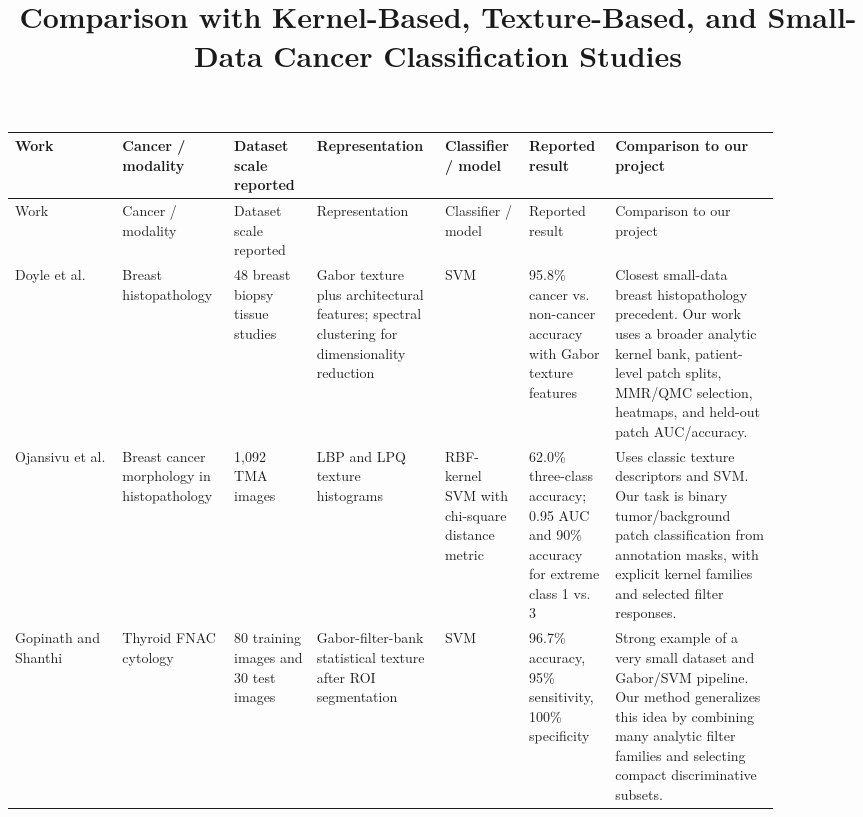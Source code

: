 \documentclass[9pt]{article}
\title{\textbf{Comparison with Kernel-Based, Texture-Based, and Small-Data Cancer Classification Studies}}
\author{}
\date{}
\begin{document}
\maketitle


\scriptsize
\begin{longtable}{p{0.13\linewidth}p{0.13\linewidth}p{0.10\linewidth}p{0.13\linewidth}p{0.10\linewidth}p{0.10\linewidth}p{0.20\linewidth}}
\toprule
Work & Cancer / modality & Dataset scale reported & Representation & Classifier / model & Reported result & Comparison to our project \\
\midrule
\endfirsthead
\toprule
Work & Cancer / modality & Dataset scale reported & Representation & Classifier / model & Reported result & Comparison to our project \\
\midrule
\endhead

Doyle et al. \cite{doyle2008} & Breast histopathology & 48 breast biopsy tissue studies & Gabor texture plus architectural features; spectral clustering for dimensionality reduction & SVM & 95.8\% cancer vs. non-cancer accuracy with Gabor texture features & Closest small-data breast histopathology precedent. Our work uses a broader analytic kernel bank, patient-level patch splits, MMR/QMC selection, heatmaps, and held-out patch AUC/accuracy. \\

Ojansivu et al. \cite{ojansivu2013} & Breast cancer morphology in histopathology & 1,092 TMA images & LBP and LPQ texture histograms & RBF-kernel SVM with chi-square distance metric & 62.0\% three-class accuracy; 0.95 AUC and 90\% accuracy for extreme class 1 vs. 3 & Uses classic texture descriptors and SVM. Our task is binary tumor/background patch classification from annotation masks, with explicit kernel families and selected filter responses. \\

Gopinath and Shanthi \cite{gopinath2013} & Thyroid FNAC cytology & 80 training images and 30 test images & Gabor-filter-bank statistical texture after ROI segmentation & SVM & 96.7\% accuracy, 95\% sensitivity, 100\% specificity & Strong example of a very small dataset and Gabor/SVM pipeline. Our method generalizes this idea by combining many analytic filter families and selecting compact discriminative subsets. \\


\end{longtable}
\end{document}
